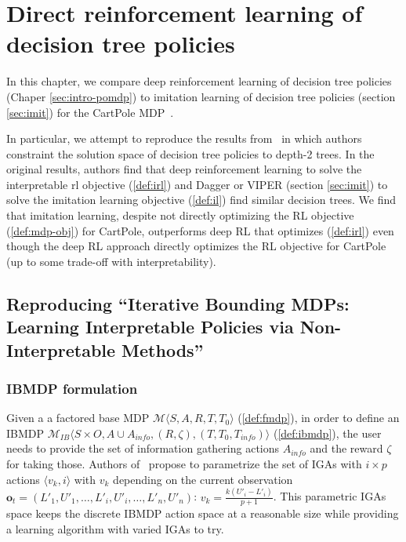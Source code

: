\chapter{Direct reinforcement learning of decision tree policies}\label{sec:topin}
In this chapter, we compare deep reinforcement learning of decision tree policies (Chaper \ref{sec:intro-pomdp}) to imitation learning of decision tree policies (section \ref{sec:imit}) for the CartPole MDP~\cite{cartpole}.

In particular, we attempt to reproduce the results from~\cite[Table 1]{topin2021iterative} in which authors constraint the solution space of decision tree policies to depth-2 trees.
In the original results, authors find that deep reinforcement learning to solve the interpretable rl objective (\ref{def:irl}) and Dagger or VIPER (section \ref{sec:imit}) to solve the imitation learning objective (\ref{def:il}) find similar decision trees.
We find that imitation learning, despite not directly optimizing the RL objective (\ref{def:mdp-obj}) for CartPole, outperforms deep RL that optimizes (\ref{def:irl}) even though the deep RL approach directly optimizes the RL objective for CartPole (up to some trade-off with interpretability).
\section{Reproducing ``Iterative Bounding MDPs: Learning Interpretable Policies via Non-Interpretable Methods''}

\subsection{IBMDP formulation}
Given a a factored base MDP $\mathcal{M}\langle S, A, R, T, T_0\rangle$ (\ref{def:fmdp}), in order to define an IBMDP $\mathcal{M}_{IB}\langle S\times O, A\cup A_{info}, (R, \zeta),( T, T_0, T_{info})\rangle$ (\ref{def:ibmdp}), the user needs to provide the set of information gathering actions $A_{info}$ and the reward $\zeta$ for taking those.
Authors of~\cite{topin2021iterative} propose to parametrize the set of IGAs with $i \times p$ actions $\langle v_k, i \rangle$ with $v_k$ depending on the current observation $\boldsymbol{o}_t=(L'_1, U'_1, \dots, L'_i, U'_i, \dots, L'_n, U'_n)$: $v_k = \frac{k(U'_i - L'_i)}{p+1}$.
This parametric IGAs space keeps the discrete IBMDP action space at a reasonable size while providing a learning algorithm with varied IGAs to try.

